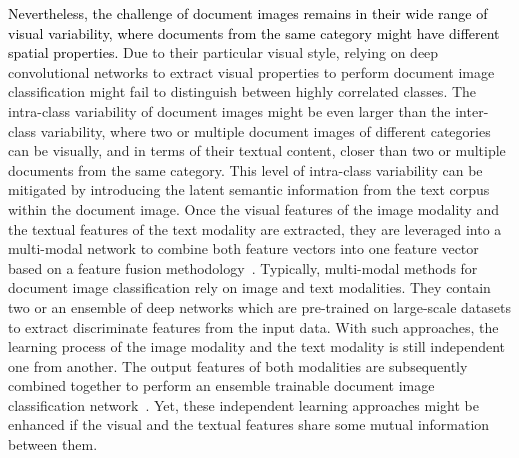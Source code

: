 \documentclass[twocolumn]{svjour3}
\begin{document}
\textcolor{black}{Nevertheless, the challenge of document images remains in their wide range of visual variability, where documents from the same category might have different spatial properties.}
Due to their particular visual style, relying on deep convolutional networks to extract visual properties to perform document image classification might fail to distinguish between highly correlated classes. The intra-class variability of document images might be even larger than the inter-class variability, where two or multiple document images of different categories can be visually, and in terms of their textual content, closer than two or multiple documents from the same category. This level of intra-class variability can be mitigated by introducing the latent semantic information from the text corpus within the document image. Once the visual features of the image modality and the textual features of the text modality are extracted, they are leveraged into a multi-modal network to combine both feature vectors into one feature vector based on a feature fusion methodology~\cite{Dauphinee2019ModularMA, audebert2019multimodal, Noce2016EmbeddedTC}.
Typically, multi-modal methods for document image classification rely on image and text modalities. They contain two or an ensemble of deep networks which are pre-trained on large-scale datasets to extract discriminate features from the input data. With such approaches, the learning process of the image modality and the text modality is still independent one from another. The output features of both modalities are subsequently combined together to perform an ensemble trainable document image classification network~\cite{Ferrando2020ImprovingAA, Xu2020LayoutLMPO, Asim2019TwoSD, Xu2020LayoutLMv2MP}. Yet, these independent learning approaches might be enhanced if the visual and the textual features share some mutual information between them.
\end{document}
